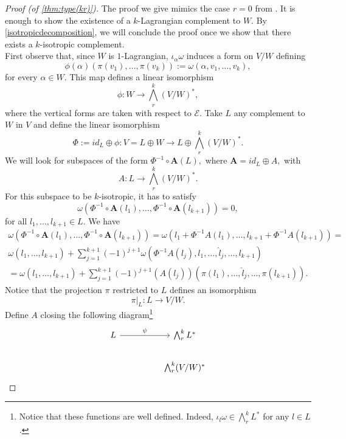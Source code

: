 \begin{proof}[Proof (of \cref{thm:type(kr)})] The proof we give mimics the case $r = 0$ from \cite{Sevestre_2019}. It is enough to show the existence of a $k$-Lagrangian complement to $W$. By \cref{isotropicdecomposition}, we will conclude the proof once we show that there exists a $k$-isotropic complement.\\

\noindent First observe that, since $W$ is $1$-Lagrangian, $\iota_\alpha \omega$ induces a form on $V/W$ defining $$\phi(\alpha)(\pi(v_1), \dots, \pi(v_{k})) := \omega(\alpha, v_1, \dots, v_k),$$ for every $\alpha \in W$. This map defines a linear isomorphism $$\phi: W \rightarrow \bigwedge^k_r (V/W)^\ast,$$ where the vertical forms are taken with respect to $\mathcal{E}.$ Take $L$ any complement to $W$ in $V$ and define the linear isomorphism $$\Phi:= id_L \oplus \phi: V = L \oplus W \rightarrow L \oplus \bigwedge^k_r (V/W)^\ast.$$ We will look for subspaces of the form $\Phi^{-1} \circ \mathbf{A} (L),$ where $\mathbf{A} = id_L \oplus A,$ with $$A: L\rightarrow \bigwedge^k_r(V/W)^\ast.$$
For this subspace to be $k$-isotropic, it has to satisfy $$\omega(\Phi^{-1} \circ \mathbf{A} (l_1), \dots, \Phi^{-1} \circ \mathbf{A}(l_{k+1})) = 0,$$ for all $l_1, \dots, l_{k+1} \in L.$ We have 
\begin{align*}
    \omega(\Phi^{-1} \circ \mathbf{A} (l_1), \dots, \Phi^{-1} \circ \mathbf{A}(l_{k+1})) = \omega(l_1 + \Phi^{-1} A ( l_1), \dots, l_{k+1} + \Phi^{-1} A ( l_{k+1})) = \\
    \omega(l_1, \dots, l_{k+1}) + \sum_{j= 1}^{k+1}(-1)^{j+1} \omega(\Phi^{-1}A(l_j), l_1, \dots, \hat{l}_j, \dots, l_{k+1})\\
    =  \omega(l_1, \dots, l_{k+1}) + \sum_{j= 1}^{k+1}(-1)^{j+1} (A(l_j)) (\pi(l_1), \dots, \hat{l}_j, \dots,  \pi(l_{k+1})).
\end{align*}
Notice that the projection $\pi$ restricted to $L$ defines an isomorphism $$\pi|_L: L \rightarrow V/W.$$
Define $A$ closing the following diagram\footnote{Notice that these functions are well defined. Indeed, $\iota_l \omega \in \bigwedge^k_r L ^\ast$ for any $l \in L$.}
\[\begin{tikzcd}
	L && {\bigwedge^k_rL^\ast} \\
	&& {\bigwedge^k_r (V/W)^\ast}
	\arrow["\psi", from=1-1, to=1-3]

\end{tikzcd}\]
\end{proof}
